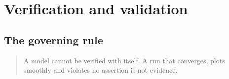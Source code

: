 \documentclass[11pt,a4paper]{article}
\begin{document}
\section{Verification and validation}\label{sec:vv}

\subsection{The governing rule}
\begin{quote}
A model cannot be verified with itself. A run that converges, plots smoothly
and violates no assertion is not evidence.
\end{quote}
\end{document}
